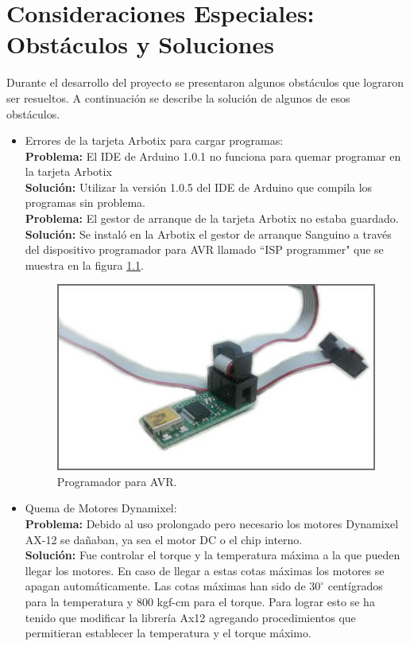 \chapter{Consideraciones Especiales: Obst\'aculos y Soluciones} \label{chapter:consideraciones}

Durante el desarrollo del proyecto se presentaron algunos obst\'aculos que lograron ser resueltos. A continuación se describe la solución de algunos de esos obstáculos. 
\begin{itemize}
\item Errores de la tarjeta Arbotix para cargar programas:\\
	
	\textbf{Problema:} El IDE de Arduino 1.0.1 no funciona para quemar programar en la tarjeta Arbotix \\
  	\textbf{Soluci\'on:} Utilizar la versión 1.0.5 del IDE de Arduino  que compila los programas sin problema. \\
	

	 \textbf{Problema:} El gestor de arranque de la tarjeta Arbotix no estaba guardado.\\
	 \textbf{Soluci\'on:}  Se instaló en la Arbotix el gestor de arranque Sanguino a través del    			    dispositivo programador para AVR llamado ``ISP programmer" que se muestra en la figura         \ref{fig:ISPprog}. 

	\begin{figure}[hbtp]
	\centering
	\includegraphics[scale=0.3]{imagenes/ISP.jpg}
	\caption{Programador para AVR.}
	\label{fig:ISPprog}
	\end{figure}
	
	

 \item Quema de Motores Dynamixel:\\

	\textbf{Problema:} Debido al uso prolongado pero necesario los motores Dynamixel AX-12 se dañaban, ya sea el motor DC o el chip interno.\\
	\textbf{Soluci\'on:} Fue controlar el torque y la temperatura máxima a la que pueden llegar los motores. En caso de llegar a estas cotas máximas los motores se apagan automáticamente. Las cotas máximas han sido de $30^{\circ}$ centígrados para la temperatura y 800 kgf-cm para el torque. Para lograr esto se ha tenido que modificar la librería Ax12 agregando procedimientos que permitieran establecer la temperatura y el torque máximo.\\


\end{itemize}
